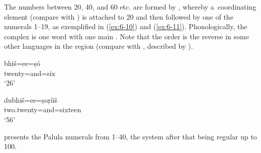 The numbers between 20, 40, and 60 etc. are formed by , whereby a~coordinating element (compare with ) is attached to 20 and then followed by one of the numerals 1--19, as exemplified in (\ref{ex:6-10}) and (\ref{ex:6-11}). Phonologically, the complex is one word with one main . Note that the order is the reverse in some other languages in the region (compare with \iliKohistani \iliGawri, described by \citealt[57]{baart1999a}).

\begin{exe}
\ex
\label{ex:6-10}
\gll bhiš=ee=ṣó \\
twenty=and=six \\
\glt `26'

\ex
\label{ex:6-11}
\gll dubhiš=ee=ṣoṛíiš \\
two.twenty=and=sixteen \\
\glt `56'
\end{exe}

 presents the Palula numerals from 1--40, the system after that being regular up to 100.


